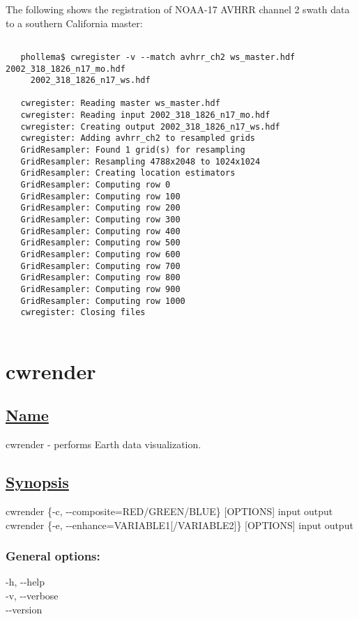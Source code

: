   The following shows the registration of NOAA-17 AVHRR channel 2 swath data to a southern California master:
\begin{verbatim}

   phollema$ cwregister -v --match avhrr_ch2 ws_master.hdf 2002_318_1826_n17_mo.hdf
     2002_318_1826_n17_ws.hdf

   cwregister: Reading master ws_master.hdf
   cwregister: Reading input 2002_318_1826_n17_mo.hdf
   cwregister: Creating output 2002_318_1826_n17_ws.hdf
   cwregister: Adding avhrr_ch2 to resampled grids
   GridResampler: Found 1 grid(s) for resampling
   GridResampler: Resampling 4788x2048 to 1024x1024
   GridResampler: Creating location estimators
   GridResampler: Computing row 0
   GridResampler: Computing row 100
   GridResampler: Computing row 200
   GridResampler: Computing row 300
   GridResampler: Computing row 400
   GridResampler: Computing row 500
   GridResampler: Computing row 600
   GridResampler: Computing row 700
   GridResampler: Computing row 800
   GridResampler: Computing row 900
   GridResampler: Computing row 1000
   cwregister: Closing files
 
\end{verbatim}

\newpage
\section{cwrender} \hypertarget{cwrender}{}
\subsection*{\underline{Name}}


   cwrender - performs Earth data visualization.  
\subsection*{\underline{Synopsis}}


  cwrender \{-c, -{-}composite=RED/GREEN/BLUE\} [OPTIONS] input output \\ 
 cwrender \{-e, -{-}enhance=VARIABLE1[/VARIABLE2]\} [OPTIONS] input output 
\subsubsection*{General options:}


  -h, -{-}help \\ 
 -v, -{-}verbose \\ 
 -{-}version \\ 


